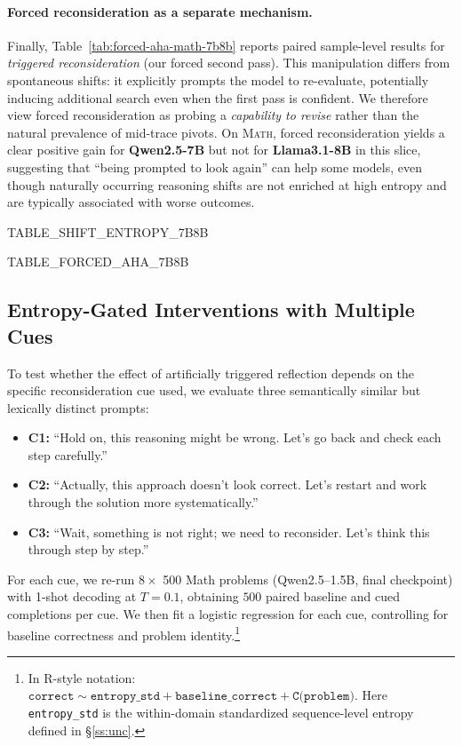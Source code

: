 \paragraph{Forced reconsideration as a separate mechanism.}
Finally, Table~\ref{tab:forced-aha-math-7b8b} reports paired sample-level results for \emph{triggered reconsideration} (our forced second pass). This manipulation differs from spontaneous shifts: it explicitly prompts the model to re-evaluate, potentially inducing additional search even when the first pass is confident. We therefore view forced reconsideration as probing a \emph{capability to revise} rather than the natural prevalence of mid-trace pivots. On \textsc{Math}, forced reconsideration yields a clear positive gain for \textbf{Qwen2.5-7B} but not for \textbf{Llama3.1-8B} in this slice, suggesting that ``being prompted to look again'' can help some models, even though naturally occurring reasoning shifts are not enriched at high entropy and are typically associated with worse outcomes.

{{TABLE_SHIFT_ENTROPY_7B8B}}

{{TABLE_FORCED_AHA_7B8B}}

\subsection{Entropy-Gated Interventions with Multiple Cues}
\label{app:uncertainty-interventions}

To test whether the effect of artificially triggered reflection depends on the specific reconsideration cue used, we evaluate three semantically similar but lexically distinct prompts:
\begin{itemize}[leftmargin=*]
    \item \textbf{C1:} ``Hold on, this reasoning might be wrong. Let's go back and check each step carefully.''
    \item \textbf{C2:} ``Actually, this approach doesn't look correct. Let's restart and work through the solution more systematically.''
    \item \textbf{C3:} ``Wait, something is not right; we need to reconsider. Let's think this through step by step.''
\end{itemize}

For each cue, we re-run $8\times$ 500 Math problems (Qwen2.5--1.5B, final checkpoint) with 1-shot decoding at $T{=}0.1$, obtaining $500$ paired baseline and cued completions per cue. We then fit a logistic regression for each cue, controlling for baseline correctness and problem identity.\footnote{In R-style notation:
\(
\texttt{correct} \sim \texttt{entropy\_std} + \texttt{baseline\_correct} + \texttt{C(problem)}.
\)
Here \texttt{entropy\_std} is the within-domain standardized sequence-level entropy defined in \S\ref{ss:unc}.}

